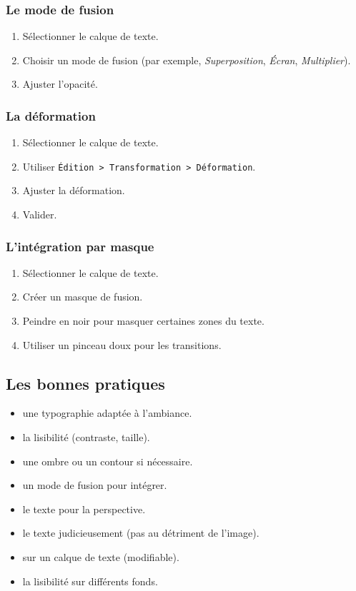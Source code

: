 \subsubsection{Le mode de fusion}

\begin{enumerate}
    \item Sélectionner le calque de texte.
    \item Choisir un mode de fusion (par exemple, \emph{Superposition}, \emph{Écran}, \emph{Multiplier}).
    \item Ajuster l'opacité.
\end{enumerate}

\subsubsection{La déformation}

\begin{enumerate}
    \item Sélectionner le calque de texte.
    \item Utiliser \texttt{Édition > Transformation > Déformation}.
    \item Ajuster la déformation.
    \item Valider.
\end{enumerate}

\subsubsection{L'intégration par masque}

\begin{enumerate}
    \item Sélectionner le calque de texte.
    \item Créer un masque de fusion.
    \item Peindre en noir pour masquer certaines zones du texte.
    \item Utiliser un pinceau doux pour les transitions.
\end{enumerate}

\subsection{Les bonnes pratiques}

\begin{itemize}
    \item {} une typographie adaptée à l'ambiance.
    \item {} la lisibilité (contraste, taille).
    \item {} une ombre ou un contour si nécessaire.
    \item {} un mode de fusion pour intégrer.
    \item {} le texte pour la perspective.
    \item {} le texte judicieusement (pas au détriment de l'image).
    \item {} sur un calque de texte (modifiable).
    \item {} la lisibilité sur différents fonds.
\end{itemize}

